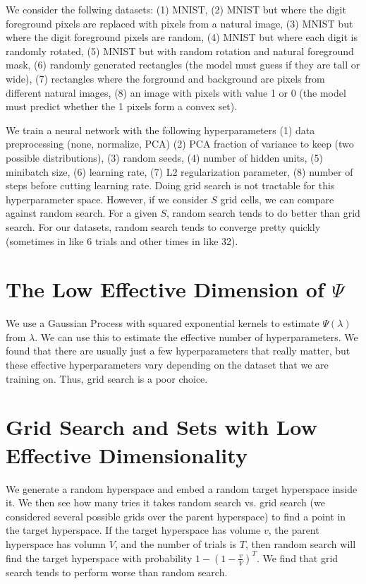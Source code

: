 \documentclass[a4paper]{article}
\begin{document}
We consider the follwing datasets: (1) MNIST, (2) MNIST but where the digit
foreground pixels are replaced with pixels from a natural image, (3) MNIST
but where the digit foreground pixels are random, (4) MNIST but where each
digit is randomly rotated, (5) MNIST but with random rotation and natural
foreground mask, (6) randomly generated rectangles (the model must guess if
they are tall or wide), (7) rectangles where the forground and background are
pixels from different natural images, (8) an image with pixels with value 1 or
0 (the model must predict whether the 1 pixels form a convex set).

We train a neural network with the following hyperparameters (1) data
preprocessing (none, normalize, PCA) (2) PCA fraction of variance to keep (two
possible distributions), (3) random seeds, (4) number of hidden units, (5)
minibatch size, (6) learning rate, (7) L2 regularization parameter, (8) number
of steps before cutting learning rate. Doing grid search is not tractable
for this hyperparameter space. However, if we consider $S$ grid cells, we can
compare against random search. For a given $S$, random search tends to do
better than grid search. For our datasets, random search tends to converge
pretty quickly (sometimes in like 6 trials and other times in like 32).

\section{The Low Effective Dimension of $\Psi$}
We use a Gaussian Process with squared exponential kernels to estimate
$\Psi(\lambda)$ from $\lambda$. We can use this to estimate the effective
number of hyperparameters. We found that there are usually just a few
hyperparameters that really matter, but these effective hyperparameters vary
depending on the dataset that we are training on. Thus, grid search is a poor
choice.

\section{Grid Search and Sets with Low Effective Dimensionality}
We generate a random hyperspace and embed a random target hyperspace inside it.
We then see how many tries it takes random search vs. grid search (we considered
several possible grids over the parent hyperspace) to find a point in the target
hyperspace. If the target hyperspace has volume $v$, the parent hyperspace has
volumn $V$, and the number of trials is $T$, then random search will find
the target hyperspace with probability $1 - (1 - \frac{v}{V})^T$. We find
that grid search tends to perform worse than random search.
\end{document}
